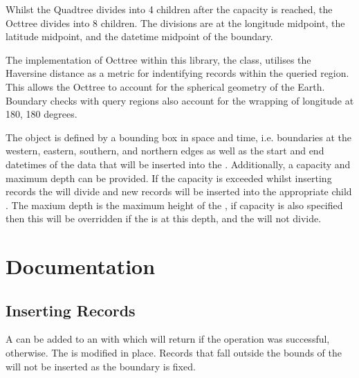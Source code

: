 \documentclass[letterpaper,10pt,english]{sphinxmanual}
\begin{document}
\sphinxAtStartPar
Whilst the Quadtree divides into 4 children after the capacity is reached, the Octtree divides into 8 children. The
divisions are at the longitude midpoint, the latitude midpoint, and the datetime midpoint of the boundary.

\sphinxAtStartPar
The implementation of Octtree within this library, the  class, utilises the Haversine distance as a metric
for indentifying records within the queried region. This allows the Octtree to account for the spherical geometry of the
Earth. Boundary checks with query regions also account for the wrapping of longitude at \sphinxhyphen{}180, 180 degrees.

\sphinxAtStartPar
The  object is defined by a bounding box in space and time, i.e. boundaries at the western, eastern,
southern, and northern edges as well as the start and end datetimes of the data that will be inserted into the .
Additionally, a capacity and maximum depth can be provided. If the capacity is exceeded whilst inserting records the
 will divide and new records will be inserted into the appropriate child . The maxium depth is the
maximum height of the , if capacity is also specified then this will be overridden if the  is at this
depth, and the  will not divide.


\section{Documentation}
\label{\detokenize{octtree:documentation}}

\subsection{Inserting Records}
\label{\detokenize{octtree:inserting-records}}
\sphinxAtStartPar
A  can be added to an  with  which will return  if the operation
was successful,  otherwise. The  is modified in place. Records that fall outside the bounds of the
 will not be inserted as the boundary is fixed.
\end{document}

